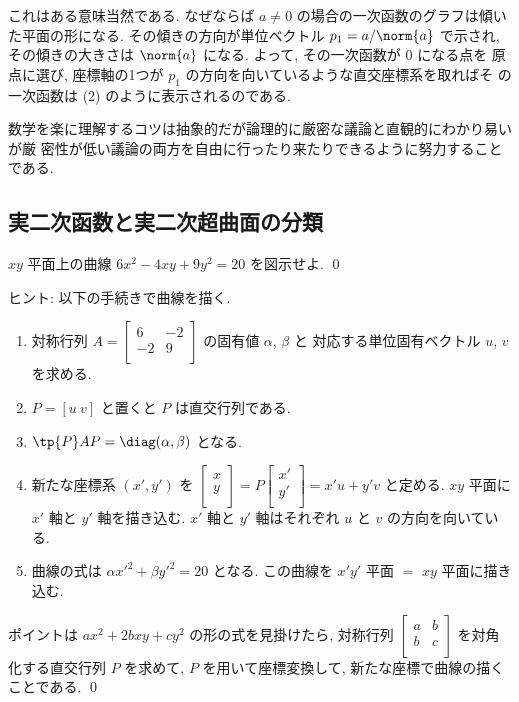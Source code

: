 \documentclass[12pt,twoside]{jarticle}
\begin{document}
これはある意味当然である. なぜならば $a\ne 0$ の場合の一次函数のグラフは傾い
た平面の形になる.  その傾きの方向が単位ベクトル $p_1=a/\norm{a}$ で示され, 
その傾きの大きさは $\norm{a}$ になる.  よって, その一次函数が $0$ になる点を
原点に選び, 座標軸の1つが $p_1$ の方向を向いているような直交座標系を取ればそ
の一次函数は (2) のように表示されるのである.

数学を楽に理解するコツは抽象的だが論理的に厳密な議論と直観的にわかり易いが厳
密性が低い議論の両方を自由に行ったり来たりできるように努力することである.


\subsection{実二次函数と実二次超曲面の分類}
\label{sec:quadric-hypersurface}


\begin{question}
\label{q:6xx-4xy+9yy=20}
  $xy$ 平面上の曲線 $6x^2 - 4xy + 9y^2 = 20$ を図示せよ. \qed
\end{question}

\noindent
ヒント: 以下の手続きで曲線を描く.
\begin{enumerate}
\item 対称行列 $A =
  \begin{bmatrix}
    6 & -2 \\
    -2 & 9 \\
  \end{bmatrix}$ の固有値 $\alpha$, $\beta$ と
  対応する単位固有ベクトル $u$, $v$ を求める.
\item $P=[u\ v]$ と置くと $P$ は直交行列である.
\item $\tp{P}AP=\diag(\alpha,\beta)$ となる.
\item 新たな座標系 $(x',y')$ を $
  \begin{bmatrix}
    x \\
    y \\
  \end{bmatrix}
  =
  P
  \begin{bmatrix}
   x' \\
   y' \\
  \end{bmatrix} = x'u + y'v$
  と定める.  $xy$ 平面に $x'$ 軸と $y'$ 軸を描き込む. 
  $x'$ 軸と $y'$ 軸はそれぞれ $u$ と $v$ の方向を向いている.
\item 曲線の式は $\alpha{x'}^2 + \beta{y'}^2 = 20$ となる.
  この曲線を $x'y'$ 平面 $=$ $xy$ 平面に描き込む.
\end{enumerate}
ポイントは $ax^2 + 2bxy + cy^2$ の形の式を見掛けたら,  対称行列 $
\begin{bmatrix}
  a & b \\
  b & c \\
\end{bmatrix}$ を対角化する直交行列 $P$ を求めて, $P$ を用いて座標変換して, 
新たな座標で曲線の描くことである.
\qed
\end{document}
